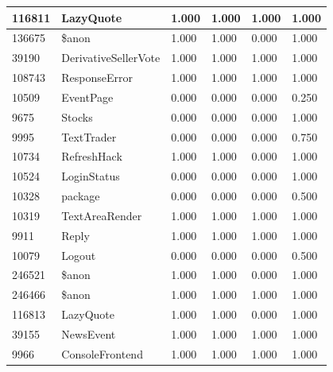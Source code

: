 \documentclass[a4paper]{article}
\newlength{\DUtablewidth} %
\begin{document}
\begin{longtable*}[c]{|p{0.160\DUtablewidth}|p{0.160\DUtablewidth}|p{0.160\DUtablewidth}|p{0.160\DUtablewidth}|p{0.160\DUtablewidth}|p{0.160\DUtablewidth}|}
116811
 & 
LazyQuote
 & 
1.000
 & 
1.000
 & 
1.000
 & 
1.000
 \\
\hline

136675
 & 
\$anon
 & 
1.000
 & 
1.000
 & 
0.000
 & 
1.000
 \\
\hline

39190
 & 
DerivativeSellerVote
 & 
1.000
 & 
1.000
 & 
1.000
 & 
1.000
 \\
\hline

108743
 & 
ResponseError
 & 
1.000
 & 
1.000
 & 
1.000
 & 
1.000
 \\
\hline

10509
 & 
EventPage
 & 
0.000
 & 
0.000
 & 
0.000
 & 
0.250
 \\
\hline

9675
 & 
Stocks
 & 
0.000
 & 
0.000
 & 
0.000
 & 
1.000
 \\
\hline

9995
 & 
TextTrader
 & 
0.000
 & 
0.000
 & 
0.000
 & 
0.750
 \\
\hline

10734
 & 
RefreshHack
 & 
1.000
 & 
1.000
 & 
0.000
 & 
1.000
 \\
\hline

10524
 & 
LoginStatus
 & 
0.000
 & 
0.000
 & 
0.000
 & 
1.000
 \\
\hline

10328
 & 
package
 & 
0.000
 & 
0.000
 & 
0.000
 & 
0.500
 \\
\hline

10319
 & 
TextAreaRender
 & 
1.000
 & 
1.000
 & 
1.000
 & 
1.000
 \\
\hline

9911
 & 
Reply
 & 
1.000
 & 
1.000
 & 
1.000
 & 
1.000
 \\
\hline

10079
 & 
Logout
 & 
0.000
 & 
0.000
 & 
0.000
 & 
0.500
 \\
\hline

246521
 & 
\$anon
 & 
1.000
 & 
1.000
 & 
0.000
 & 
1.000
 \\
\hline

246466
 & 
\$anon
 & 
1.000
 & 
1.000
 & 
1.000
 & 
1.000
 \\
\hline

116813
 & 
LazyQuote
 & 
1.000
 & 
1.000
 & 
0.000
 & 
1.000
 \\
\hline

39155
 & 
NewsEvent
 & 
1.000
 & 
1.000
 & 
1.000
 & 
1.000
 \\
\hline

9966
 & 
ConsoleFrontend
 & 
1.000
 & 
1.000
 & 
1.000
 & 
1.000
 \\
\hline


\end{longtable*}
\end{document}
